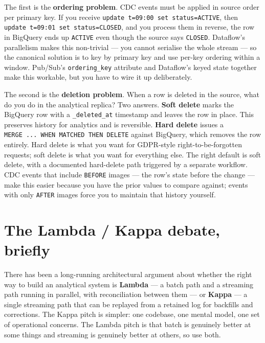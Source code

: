 \documentclass[
  11pt,
  british,
  oneside]{book}
\begin{document}
The first is the \textbf{ordering problem}. CDC events must be applied
in source order per primary key. If you receive
\texttt{update\ t=09:00\ set\ status=ACTIVE}, then
\texttt{update\ t=09:01\ set\ status=CLOSED}, and you process them in
reverse, the row in BigQuery ends up \texttt{ACTIVE} even though the
source says \texttt{CLOSED}. Dataflow's parallelism makes this
non-trivial --- you cannot serialise the whole stream --- so the
canonical solution is to key by primary key and use per-key ordering
within a window. Pub/Sub's \texttt{ordering\_key} attribute and
Dataflow's keyed state together make this workable, but you have to wire
it up deliberately.

The second is the \textbf{deletion problem}. When a row is deleted in
the source, what do you do in the analytical replica? Two answers.
\textbf{Soft delete} marks the BigQuery row with a
\texttt{\_deleted\_at} timestamp and leaves the row in place. This
preserves history for analytics and is reversible. \textbf{Hard delete}
issues a \texttt{MERGE\ ...\ WHEN\ MATCHED\ THEN\ DELETE} against
BigQuery, which removes the row entirely. Hard delete is what you want
for GDPR-style right-to-be-forgotten requests; soft delete is what you
want for everything else. The right default is soft delete, with a
documented hard-delete path triggered by a separate workflow. CDC events
that include \texttt{BEFORE} images --- the row's state before the
change --- make this easier because you have the prior values to compare
against; events with only \texttt{AFTER} images force you to maintain
that history yourself.

\hypertarget{the-lambda-kappa-debate-briefly}{%
\section{The Lambda / Kappa debate,
briefly}\label{the-lambda-kappa-debate-briefly}}

There has been a long-running architectural argument about whether the
right way to build an analytical system is \textbf{Lambda} --- a batch
path and a streaming path running in parallel, with reconciliation
between them --- or \textbf{Kappa} --- a single streaming path that can
be replayed from a retained log for backfills and corrections. The Kappa
pitch is simpler: one codebase, one mental model, one set of operational
concerns. The Lambda pitch is that batch is genuinely better at some
things and streaming is genuinely better at others, so use both.
\end{document}
